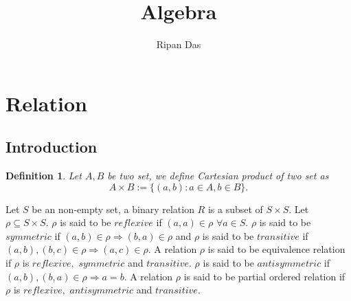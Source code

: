 \documentclass[11pt]{amsart}
\title[]{Algebra}
\author[]{Ripan Das}
\newtheorem{defn}[theorem]{Definition}
\begin{document}
\maketitle
\newpage 
\tableofcontents
\newpage
\section{Relation}
\subsection{Introduction}
\begin{defn}
Let $A,B$ be two set, we define Cartesian product of two set as $$A\times B:=\{(a,b):a\in A,b\in B\}.$$
\end{defn}
Let $S$ be an non-empty set, a binary relation $R$ is a subset of $S \times S$. Let $\rho \subseteq S \times S.$ $\rho$ is said to be $reflexive$ if $(a,a) \in \rho$ $\forall a \in S.$ $\rho$ is said to be $symmetric$ if $(a,b) \in \rho \Rightarrow (b,a) \in \rho $ and $\rho$ is said to be $transitive$ if $(a,b),(b,c) \in \rho \Rightarrow (a,c) \in \rho.$ A relation $\rho$ is said to be equivalence relation if $\rho$ is $reflexive,$ $symmetric$ and $transitive.$ $\rho$ is said to be $antisymmetric$ if $(a,b),(b,a) \in \rho \Rightarrow a=b.$ A relation $\rho$ is said to be partial ordered relation if $\rho$ is $reflexive,$ $antisymmetric$ and $transitive.$
\end{document}
